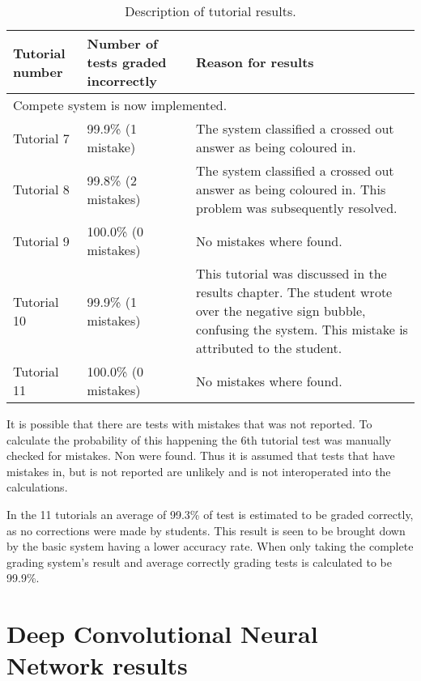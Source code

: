 \begin{table}
\caption{Description of tutorial results.} \label{tbl:tutResults2}
  \centering
\begin{tabular}{|p{2cm}|p{4cm}|p{5cm}|}
\hline
\textbf{Tutorial number}&\textbf{Number of tests graded incorrectly}&\textbf{Reason for results}\\
\hline
\multicolumn{3}{|l|}{Compete system is now implemented.}\\
\hline
Tutorial 7&99.9\% (1 mistake)&The system classified a crossed out answer as being coloured in.\\
\hline
Tutorial 8&99.8\% (2 mistakes)&The system classified a crossed out answer as being coloured in. This problem was subsequently resolved.\\
\hline
Tutorial 9&100.0\% (0 mistakes)&No mistakes where found.\\
\hline
Tutorial 10&99.9\% (1 mistakes)&This tutorial was discussed in the results chapter. The student wrote over the negative sign bubble, confusing the system. This mistake is attributed to the student.\\
\hline
Tutorial 11&100.0\% (0 mistakes)&No mistakes where found.\\
\hline
\end{tabular}
\end{table}

It is possible that there are tests with mistakes that was not reported. To calculate the probability of this happening the 6th tutorial test was manually checked for mistakes. Non were found. Thus it is assumed that tests that have mistakes in, but is not reported are unlikely and is not interoperated into the calculations.

In the 11 tutorials an average of 99.3\% of test is estimated to be graded correctly, as no corrections were made by students.  This result is seen to be brought down by the basic system having a lower accuracy rate. When only taking the complete grading system's result and average correctly grading tests is calculated to be 99.9\%.


\section{Deep Convolutional Neural Network results}
\label{sec:DCNNresult}

